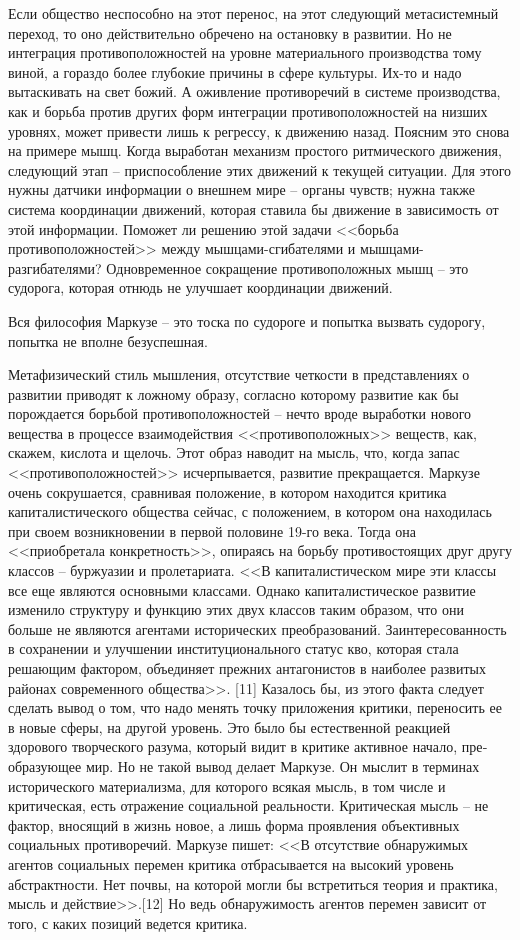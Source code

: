 \documentclass{book}
\begin{document}
Если общество неспособно на этот перенос, на этот следу­ющий метасистемный переход, то оно действительно обречено на остановку в развитии. Но не интеграция противоположно­стей на уровне материального производства тому виной, а гораз­до более глубокие причины в сфере культуры. Их-то и надо вытаскивать на свет божий. А оживление противоречий в систе­ме производства, как и борьба против других форм интегра­ции противоположностей на низших уровнях, может привести лишь к регрессу, к движению назад. Поясним это снова на при­мере мышц. Когда выработан механизм простого ритмического движения, следующий этап -- приспособление этих движений к текущей ситуации. Для этого нужны датчики информации о внешнем мире -- органы чувств; нужна также система коор­динации движений, которая ставила бы движение в зависи­мость от этой информации. Поможет ли решению этой задачи <<борьба противоположностей>> между мышцами-сгибателями и мышцами-разгибателями? Одновременное сокращение проти­воположных мышц -- это судорога, которая отнюдь 
не улучшает координации движений.

Вся философия Маркузе -- это тоска по судороге и попытка вызвать судорогу, попытка не вполне безуспешная.

Метафизический стиль мышления, отсутствие четкости в представлениях о развитии приводят к ложному образу, со­гласно которому развитие как бы порождается борьбой про­тивоположностей -- нечто вроде выработки нового вещества в процессе взаимодействия <<противоположных>> веществ, как, скажем, кислота и щелочь. Этот образ наводит на мысль, что, когда запас <<противоположностей>> исчерпывается, развитие прекращается. Маркузе очень сокрушается, сравнивая поло­жение, в котором находится критика капиталистического об­щества сейчас, с положением, в котором она находилась при своем возникновении в первой половине 19-го века. Тогда она <<приобретала конкретность>>, опираясь на борьбу противо­стоящих друг другу классов -- буржуазии и пролетариата. <<В капиталистическом мире эти классы все еще являются основ­ными классами. Однако капиталистическое развитие измени­ло структуру и функцию этих двух классов таким образом, что они больше не являются агентами исторических преобра­зований. Заинтересованность в сохранении и 
улучшении 
инсти­туционального статус кво, которая стала решающим фактором, объединяет прежних антагонистов в наиболее развитых рай­онах современного общества>>. [11] Казалось бы, из этого фак­та следует сделать вывод о том, что надо менять точку прило­жения критики, переносить ее в новые сферы, на другой уро­вень. Это было бы естественной реакцией здорового творче­ского разума, который видит в критике активное начало, пре­образующее мир. Но не такой вывод делает Маркузе. Он мыслит в терминах исторического материализма, для которого всякая мысль, в том числе и критическая, есть отражение социальной реальности. Критическая мысль -- не фактор, вносящий в жизнь новое, а лишь форма проявления объективных социальных противоречий. Маркузе пишет: <<В отсутствие обнаружимых агентов социальных перемен критика отбрасывается на высо­кий уровень абстрактности. Нет почвы, на которой могли бы встретиться теория и практика, мысль и действие>>.[12] Но ведь обнаружимость агентов перемен зависит от того, с каких пози­ций ведется критика.
 
\end{document}
